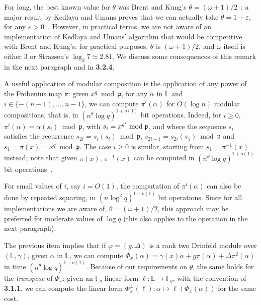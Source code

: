 \documentclass[sigconf]{acmart}
\newcommand{\F}{\mathbb{F}}
\renewcommand{\L}{\mathbb{L}}
\newcommand{\frakp}{\mathfrak{p}}
\begin{document}
For long, the best known value for $\theta$ was Brent and Kung's
$\theta = (\omega+1)/2$~\cite{BrKu78}; a major result by Kedlaya and
Umans proves that we can actually take $\theta = 1+\varepsilon$, for
any $\varepsilon >
0$~\cite{Kedlaya:2011:FPF:2340436.2340448}. However, in practical
terms, we are not aware of an implementation of Kedlaya and Umans'
algorithm that would be competitive with Brent and Kung's: for
practical purposes, $\theta$ is $(\omega+1)/2$, and $\omega$ itself is
either 3 or Strassen's $\log_2 7 \simeq 2.81$. We discuss some
consequences of this remark in the next paragraph and in {\bf 3.2.4}.

\smallskip{}  A useful application of modular
composition is the application of any power of the Frobenius map
$\pi$: given $x^q \bmod \frakp$, for any $\alpha$ in $\L$ and $i \in
\{-(n-1),\dots,n-1\}$, we can compute $\pi^i(\alpha)$ for $O(\log n)$
modular compositions, that is, in $(n^\theta \log q)^{1+o(1)}$ bit
operations. Indeed, for $i \ge 0$, $\pi^i(\alpha) =
\alpha(s_i) \bmod \frakp$, with $s_i = x^{q^i} \bmod \frak p$, and
where the sequence $s_i$ satisfies the recurrence $s_{2i} = s_i(s_i)
\bmod \frakp$, $s_{2i+1} = s_{2i}(s_1) \bmod \frakp$ and $s_1 = \pi(x)
= x^q \bmod \frakp$. The case $i \ge 0$ is similar, starting from $s_1
= \pi^{-1}(x)$ instead; note that given $\pi(x)$, $\pi^{-1}(x)$ can be computed
in $(n^\theta \log q)^{1+o(1)}$ bit
operations~\cite{eschost2017arXiv171200669D}.

For small values of $i$, say $i=O(1)$, the computation of
$\pi^i(\alpha)$ can also be done by repeated squaring, in $(n \log^2
q)^{1+o(1)}$ bit operations.  Since for all implementations we are
aware of, $\theta=(\omega+1)/2$, this approach may be preferred for
moderate values of $\log q$ (this also applies to the operation in the
next paragraph).

\smallskip{} The previous item implies that if
$\varphi=(g,\Delta)$ is a rank two Drinfeld module over $(\L,\gamma)$,
given $\alpha$ in $\L$, we can compute $\Phi_x(\alpha) = \gamma(x)
\alpha + g \pi(\alpha) + \Delta \pi^2(\alpha)$ in time $(n^{\theta}
\log q)^{1+o(1)}$.  Because of our requirements on $\theta$, the same
holds for the {\em transpose} of $\Phi_x$: given an $\F_q$-linear form
$\ell:\L\to \F_q$, with the convention of {\bf 3.1.1}, we can compute
the linear form $\Phi_x^\perp(\ell): \alpha\mapsto
\ell(\Phi_x(\alpha))$ for the same cost.



\end{document}
